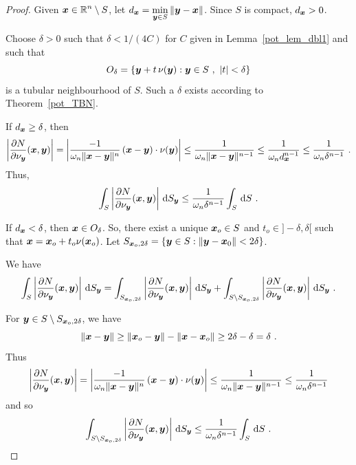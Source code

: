 \begin{proof}
Given $\displaystyle {\bm{x}} \in \mathbb{R}^n\setminus S$, let
$\displaystyle d_{{\bm{x}}} = \min_{{\bm{y}} \in S}\|{\bm{y}} - {\bm{x}}\|$.
Since $S$ is compact, $\displaystyle d_{{\bm{x}}} >0$.

Choose $\delta >0$ such that $\delta < 1/(4C)$ for $C$ given in
Lemma~\ref{pot_lem_dbl1} and such that
\[
O_{\delta} = \left\{ {\bm{y}} + t\, \nu({\bm{y}}) : {\bm{y}} \in S \ ,
\ |t|<\delta \right\}
\]
is a tubular neighbourhood of $S$.  Such a $\delta$ exists according
to Theorem~\ref{pot_TBN}.

 If $\displaystyle d_{{\bm{x}}} \geq \delta$, then
\[
\left| \frac{\partial{N}}{\partial \nu_{{\bm{y}}}}({\bm{x}},{\bm{y}})\right| 
= \left| \frac{-1}{\omega_n \|{\bm{x}}-{\bm{y}}\|^n}\,({\bm{x}}-{\bm{y}})
\cdot \nu({\bm{y}}) \right|
\leq \frac{1}{\omega_n \|{\bm{x}}-{\bm{y}}\|^{n-1}}
\leq \frac{1}{\omega_n d_{{\bm{x}}}^{n-1}}
\leq \frac{1}{\omega_n \delta^{n-1}} \ .
\]
Thus,
\begin{equation} \label{Bounddny1}
\int_S \left| \pdydx{N}{\nu_{\VEC{y}}}(\VEC{x},\VEC{y})
\right| \dss{S}{y} \leq \frac{1}{\omega_n \delta^{n-1}} \int_S \dx{S} \ .
\end{equation}

  If $\displaystyle d_{{\bm{x}}} < \delta$, then
${\bm{x}} \in O_{\delta}$.  So, there exist a unique
${\bm{x}}_o \in S$ and $t_o \in ]-\delta,\delta[$ such
that
$\displaystyle {\bm{x}} = {\bm{x}}_o + t_o\nu({\bm{x}}_o)$.
Let $\displaystyle S_{{\bm{x}}_o,2\delta} = 
\left\{ {\bm{y}} \in S : \|{\bm{y}} - {\bm{x}}_0\| < 2\delta \right\}$.

We have
\[
\int_S \left| \frac{\partial{N}}{\partial \nu_{{\bm{y}}}}({\bm{x}},{\bm{y}}) \right|
\,\mathrm{d}{S}_{{\bm{y}}}
= \int_{S_{{\bm{x}}_o,2\delta}}
\left| \frac{\partial{N}}{\partial \nu_{{\bm{y}}}}({\bm{x}},{\bm{y}}) \right| \,\mathrm{d}{S}_{{\bm{y}}}
+ \int_{S\setminus S_{{\bm{x}}_o,2\delta}}
\left| \frac{\partial{N}}{\partial \nu_{{\bm{y}}}}({\bm{x}},{\bm{y}}) \right|
\,\mathrm{d}{S}_{{\bm{y}}} \ .
\]

For ${\bm{y}} \in S \setminus S_{{\bm{x}}_o,2\delta}$, we have
\[
\|{\bm{x}} - {\bm{y}} \|
\geq \|{\bm{x}}_o-{\bm{y}}\| - \|{\bm{x}}-{\bm{x}}_o\|
\geq 2\delta - \delta = \delta \ .
\]
Thus
\[
\left| \frac{\partial{N}}{\partial \nu_{{\bm{y}}}}({\bm{x}},{\bm{y}})\right| 
= \left| \frac{-1}{\omega_n \|{\bm{x}}-{\bm{y}}\|^n}\,({\bm{x}}-{\bm{y}})
\cdot \nu({\bm{y}}) \right|
\leq \frac{1}{\omega_n \|{\bm{x}}-{\bm{y}}\|^{n-1}}
\leq \frac{1}{\omega_n \delta^{n-1}}
\]
and so
\begin{equation}  \label{Bounddny2}
\int_{S\setminus S_{{\bm{x}}_o,2\delta}}
\left| \frac{\partial{N}}{\partial \nu_{{\bm{y}}}}({\bm{x}},{\bm{y}}) \right| \,\mathrm{d}{S}_{{\bm{y}}}
\leq \frac{1}{\omega_n \delta^{n-1}} \int_S \,\mathrm{d}{S} \ .
\end{equation}


\end{proof}
